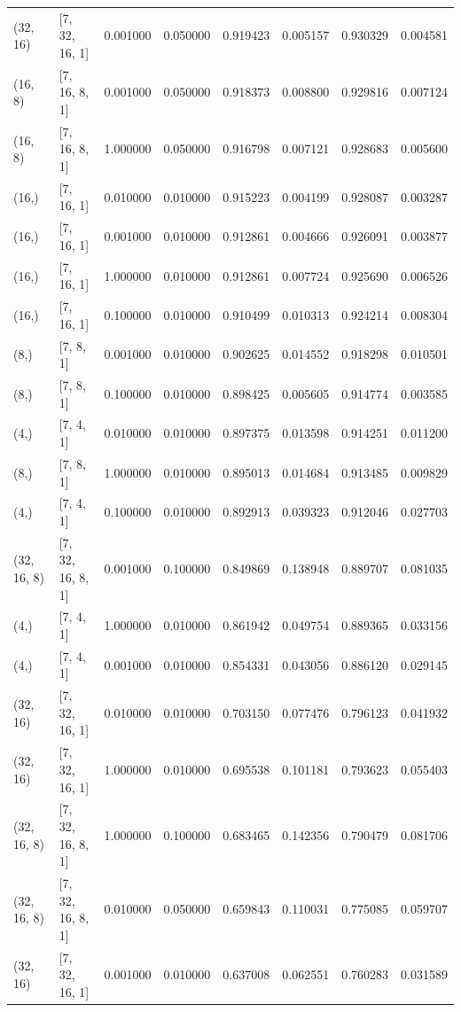 \begin{tabular}{llrrrrrr}
(32, 16) & [7, 32, 16, 1] & 0.001000 & 0.050000 & 0.919423 & 0.005157 & 0.930329 & 0.004581 \\
(16, 8) & [7, 16, 8, 1] & 0.001000 & 0.050000 & 0.918373 & 0.008800 & 0.929816 & 0.007124 \\
(16, 8) & [7, 16, 8, 1] & 1.000000 & 0.050000 & 0.916798 & 0.007121 & 0.928683 & 0.005600 \\
(16,) & [7, 16, 1] & 0.010000 & 0.010000 & 0.915223 & 0.004199 & 0.928087 & 0.003287 \\
(16,) & [7, 16, 1] & 0.001000 & 0.010000 & 0.912861 & 0.004666 & 0.926091 & 0.003877 \\
(16,) & [7, 16, 1] & 1.000000 & 0.010000 & 0.912861 & 0.007724 & 0.925690 & 0.006526 \\
(16,) & [7, 16, 1] & 0.100000 & 0.010000 & 0.910499 & 0.010313 & 0.924214 & 0.008304 \\
(8,) & [7, 8, 1] & 0.001000 & 0.010000 & 0.902625 & 0.014552 & 0.918298 & 0.010501 \\
(8,) & [7, 8, 1] & 0.100000 & 0.010000 & 0.898425 & 0.005605 & 0.914774 & 0.003585 \\
(4,) & [7, 4, 1] & 0.010000 & 0.010000 & 0.897375 & 0.013598 & 0.914251 & 0.011200 \\
(8,) & [7, 8, 1] & 1.000000 & 0.010000 & 0.895013 & 0.014684 & 0.913485 & 0.009829 \\
(4,) & [7, 4, 1] & 0.100000 & 0.010000 & 0.892913 & 0.039323 & 0.912046 & 0.027703 \\
(32, 16, 8) & [7, 32, 16, 8, 1] & 0.001000 & 0.100000 & 0.849869 & 0.138948 & 0.889707 & 0.081035 \\
(4,) & [7, 4, 1] & 1.000000 & 0.010000 & 0.861942 & 0.049754 & 0.889365 & 0.033156 \\
(4,) & [7, 4, 1] & 0.001000 & 0.010000 & 0.854331 & 0.043056 & 0.886120 & 0.029145 \\
(32, 16) & [7, 32, 16, 1] & 0.010000 & 0.010000 & 0.703150 & 0.077476 & 0.796123 & 0.041932 \\
(32, 16) & [7, 32, 16, 1] & 1.000000 & 0.010000 & 0.695538 & 0.101181 & 0.793623 & 0.055403 \\
(32, 16, 8) & [7, 32, 16, 8, 1] & 1.000000 & 0.100000 & 0.683465 & 0.142356 & 0.790479 & 0.081706 \\
(32, 16, 8) & [7, 32, 16, 8, 1] & 0.010000 & 0.050000 & 0.659843 & 0.110031 & 0.775085 & 0.059707 \\
(32, 16) & [7, 32, 16, 1] & 0.001000 & 0.010000 & 0.637008 & 0.062551 & 0.760283 & 0.031589 \\

\end{tabular}
